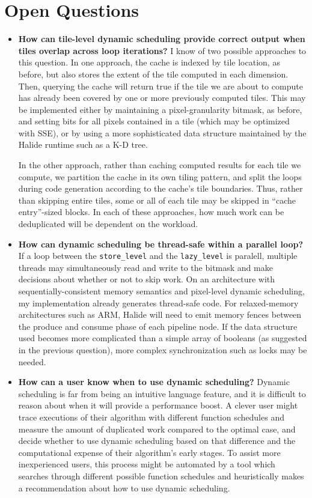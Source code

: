 \documentclass{article}
\begin{document}
\section{Open Questions}
\label{sec:future}

\begin{itemize}
\item \textbf{How can tile-level dynamic scheduling provide correct output when tiles overlap across loop iterations?} I know of two possible approaches to this question. In one approach, the cache is indexed by tile location, as before, but also stores the extent of the tile computed in each dimension. Then, querying the cache will return true if the tile we are about to compute has already been covered by one or more previously computed tiles. This may be implemented either by maintaining a pixel-granularity bitmask, as before, and setting bits for all pixels contained in a tile (which may be optimized with SSE), or by using a more sophisticated data structure maintained by the Halide runtime such as a K-D tree.

In the other approach, rather than caching computed results for each tile we compute, we partition the cache in its own tiling pattern, and split the loops during code generation according to the cache's tile boundaries. Thus, rather than skipping entire tiles, some or all of each tile may be skipped in ``cache entry''-sized blocks. In each of these approaches, how much work can be deduplicated will be dependent on the workload.

\item \textbf{How can dynamic scheduling be thread-safe within a parallel loop?}
If a loop between the \texttt{store\_level} and the \texttt{lazy\_level} is paralell, multiple threads may simultaneously read and write to the bitmask and make decisions about whether or not to skip work.
On an architecture with sequentially-consistent memory semantics and pixel-level dynamic scheduling, my implementation already generates thread-safe code. For relaxed-memory architectures such as ARM, Halide will need to emit memory fences between the produce and consume phase of each pipeline node. If the data structure used becomes more complicated than a simple array of booleans (as suggested in the previous question), more complex synchronization such as locks may be needed.

\item \textbf{How can a user know when to use dynamic scheduling?}
Dynamic scheduling is far from being an intuitive language feature, and it is difficult to reason about when it will provide a performance boost. A clever user might trace executions of their algorithm with different function schedules and measure the amount of duplicated work compared to the optimal case, and decide whether to use dynamic scheduling based on that difference and the computational expense of their algorithm's early stages. To assist more inexperienced users, this process might be automated by a tool which searches through different possible function schedules and heuristically makes a recommendation about how to use dynamic scheduling.

\end{itemize}
\end{document}

